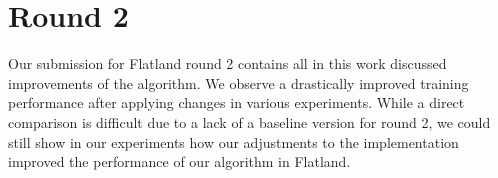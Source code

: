 
\section{Round 2}
Our submission for Flatland round 2 contains all in this work discussed improvements of the algorithm. We observe a drastically improved training performance after applying changes in various experiments. While a direct comparison is difficult due to a lack of a baseline version for round 2, we could still show in our experiments how our adjustments to the implementation improved the performance of our algorithm in Flatland.\\




